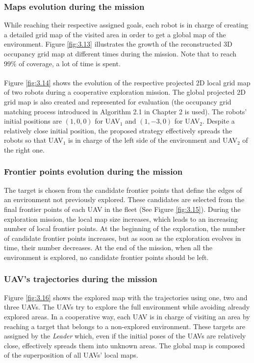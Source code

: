 \documentclass[11pt,openany]{book}
\begin{document}
\subsubsection{Maps evolution during the mission}
While reaching their respective assigned goals, each robot is in charge of creating a detailed grid map of the visited area in order to get a global map of the environment. Figure \ref{fig:3.13} illustrates the growth of the reconstructed 3D occupancy grid map at diﬀerent times during the mission. Note that to reach $99\%$ of coverage, a lot of time is spent.\\\\
Figure \ref{fig:3.14} shows the evolution of the respective projected 2D local grid map of two robots during a cooperative exploration mission. The global projected 2D grid map is also created and represented for evaluation (the occupancy grid matching process introduced in Algorithm 2.1 in Chapter 2 is used). The robots’ initial positions are $(1,0,0)$ for UAV$_1$ and $(1,-3,0)$ for UAV$_2$. Despite a relatively close initial position, the proposed strategy eﬀectively spreads the robots so that UAV$_1$ is in charge of the left side of the environment and UAV$_2$ of the right one.
\subsubsection{Frontier points evolution during the mission}
The target is chosen from the candidate frontier points that deﬁne the edges of an environment not previously explored. These candidates are selected from the ﬁnal frontier points of each UAV in the ﬂeet (See Figure \ref{fig:3.15}). During the exploration mission, the local map size increases, which leads to an increasing number of local frontier points. At the beginning of the exploration, the number of candidate frontier points increases, but as soon as the exploration evolves in time, their number decreases. At the end of the mission, when all the environment is explored, no candidate frontier points should be left.
\subsubsection{UAV's trajectories during the mission}
Figure \ref{fig:3.16} shows the explored map with the trajectories using one, two and three UAVs. The UAVs try to explore the full environment while avoiding already explored areas. In a cooperative way, each UAV is in charge of visiting an area by reaching a target that belongs to a non-explored environment. These targets are assigned by the \textit{Leader} which, even if the initial poses of the UAVs are relatively close, eﬀectively spreads them into unknown areas. The global map is composed of the superposition of all UAVs’ local maps.
\end{document}
